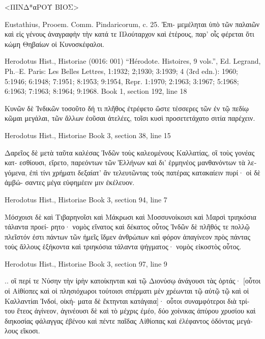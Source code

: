 \documentclass[12pt,letterpaper,twoside,final]{memoir}
\begin{document}
\begin{greek}
<ΠΙΝΔ*αΡΟΥ ΒΙΟΣ>


 Eustathius, Prooem. Comm. Pindaricorum, c. 25. Ἐπι-
μεμέληται ὑπὸ τῶν παλαιῶν καὶ εἰς γένους ἀναγραφὴν τὴν 
κατά τε Πλούταρχον καὶ ἑτέρους, παρ' οἷς φέρεται ὅτι 
κώμη Θηβαίων οἱ Κυνοσκέφαλοι. 



Herodotus Hist., Historiae (0016: 001)
“Hérodote. Histoires, 9 vols.”, Ed. Legrand, Ph.–E.
Paris: Les Belles Lettres, 1:1932; 2;1930; 3:1939; 4 (3rd edn.): 1960; 5:1946; 6:1948; 7:1951; 8:1953; 9:1954, Repr. 1:1970; 2:1963; 3:1967; 5:1968; 6:1963; 7:1963; 8:1964; 9:1968.
Book 1, section 192, line 18

                                                    Κυνῶν δὲ 
Ἰνδικῶν τοσοῦτο δή τι πλῆθος ἐτρέφετο ὥστε τέσσερες 
τῶν ἐν τῷ πεδίῳ κῶμαι μεγάλαι, τῶν ἄλλων ἐοῦσαι ἀτελέες, 
τοῖσι κυσὶ προσετετάχατο σιτία παρέχειν. 



Herodotus Hist., Historiae 
Book 3, section 38, line 15

                               Δαρεῖος δὲ μετὰ ταῦτα καλέσας 
Ἰνδῶν τοὺς καλεομένους Καλλατίας, οἳ τοὺς γονέας κατ-
εσθίουσι, εἴρετο, παρεόντων τῶν Ἑλλήνων καὶ δι' ἑρμηνέος 
μανθανόντων τὰ λεγόμενα, ἐπὶ τίνι χρήματι δεξαίατ' ἂν 
τελευτῶντας τοὺς πατέρας κατακαίειν πυρί· οἱ δὲ ἀμβώ-
σαντες μέγα εὐφημέειν μιν ἐκέλευον. 



Herodotus Hist., Historiae 
Book 3, section 94, line 7

               Μόσχοισι δὲ καὶ Τιβαρηνοῖσι καὶ Μάκρωσι 
καὶ Μοσσυνοίκοισι καὶ Μαρσὶ τριηκόσια τάλαντα προεί-
ρητο· νομὸς εἴνατος καὶ δέκατος οὗτος Ἰνδῶν δὲ πλῆθός 
τε πολλῷ πλεῖστόν ἐστι πάντων τῶν ἡμεῖς ἴδμεν 
ἀνθρώπων καὶ φόρον ἀπαγίνεον πρὸς πάντας τοὺς ἄλλους 
ἑξήκοντα καὶ τριηκόσια τάλαντα ψήγματος· νομὸς εἰκοστὸς 
οὗτος. 



Herodotus Hist., Historiae 
Book 3, section 97, line 9

                                        .. οἳ περί τε Νύσην 
τὴν ἱρὴν κατοίκηνται καὶ τῷ Διονύσῳ ἀνάγουσι τὰς ὁρτάς· 
[οὗτοι οἱ Αἰθίοπες καὶ οἱ πλησιόχωροι τούτοισι σπέρματι 
μὲν χρέωνται τῷ αὐτῷ τῷ καὶ οἱ Καλλαντίαι Ἰνδοί, οἰκή-
ματα δὲ ἔκτηνται κατάγαια]· οὗτοι συναμφότεροι διὰ τρί-
του ἔτεος ἀγίνεον, ἀγινέουσι δὲ καὶ τὸ μέχρις ἐμέο, δύο   
χοίνικας ἀπύρου χρυσίου καὶ διηκοσίας φάλαγγας ἐβένου 
καὶ πέντε παῖδας Αἰθίοπας καὶ ἐλέφαντος ὀδόντας μεγά-
λους εἴκοσι. 




\end{greek}
\end{document}
